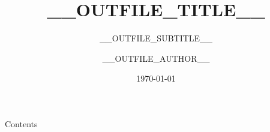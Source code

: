 \documentclass[aspectratio=169]{beamer}
\title{__OUTFILE_TITLE__}
\subtitle{__OUTFILE_SUBTITLE__}
\author{__OUTFILE_AUTHOR__}
\institute{__OUTFILE_INSTITUTE__}
\date{\today}
\begin{document}

\begin{frame}
	\titlepage
\end{frame}

\begin{frame}{Contents}
	\tableofcontents
\end{frame}

\makeatother


\end{document}
